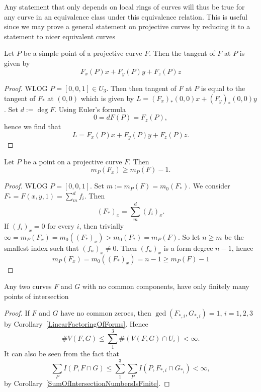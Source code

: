     \begin{remark}
        Any statement that only depends on local rings of curves will thus be true for any curve in an equivalence class under this equivalence relation. This is useful since we may prove a general statement on projective curves by reducing it to a statement to nicer equivalent curves 
    \end{remark}
    \begin{lemma}
        Let $P$ be a simple point of a projective curve $F$. Then the tangent of $F$ at $P$ is given by 
        $$F_x(P)x+F_y(P)y+F_z(P)z$$
    \end{lemma}
    \begin{proof}
        WLOG $P=[0,0,1]\in U_3$. Then then tangent of $F$ at $P$ is equal to the tangent of $F_\ast$ at $(0,0)$ which is given by $L=(F_x)_\ast(0,0)x+(F_y)_\ast(0,0)y$. Set $d:= \deg F$. Using Euler's formula
        $$0=dF(P) = F_z(P),$$
        hence we find that
        $$L= F_x(P)x+F_y(P)y+F_z(P)z.$$
    \end{proof}
    \begin{lemma}\label{MultiplicityOfPartialDerivative}
        Let $P$ be a point on a projective curve $F$. Then 
        $$m_P(F_x)\geq m_P(F)-1.$$
    \end{lemma}
    \begin{proof}
        WLOG $P=[0,0,1]$. Set $m:= m_P(F)=m_0(F_\ast)$. We consider $F_\ast=F(x,y,1)= \sum_m^d f_i$. Then 
        $$(F_\ast)_x = \sum_m ^d (f_i)_x.$$
        If $(f_i)_x=0$ for every $i$, then trivially $\infty = m_P(F_x)=m_0((F_\ast)_x)> m_0(F_\ast)=m_P(F)$. So let $n\geq m$ be the smallest index such that $(f_n)_x\neq0$. Then $(f_n)_x$ is a form degree $n-1$, hence 
        $$m_P(F_x)=m_0((F_\ast)_x)=n-1\geq m_P(F)-1$$
    \end{proof}
    \begin{proposition}\label{ProjectiveCurvesWithNoCommonComponentsHaveFinitelyManyIntersections}
        Any two curves $F$ and $G$ with no common components, have only finitely many points of intersection
    \end{proposition}
    \begin{proof}
        If $F$ and $G$ have no common zeroes, then $\gcd(F_{\ast,i},G_{\ast,i})=1$, $i=1,2,3$ by Corollary~\ref{LinearFactoringOfForms}. Hence 
        $$\#V(F,G)\leq \sum_1^3 \#(V(F,G)\cap U_i)<\infty.$$
        It can also be seen from the fact that 
        $$\sum_P I(P,F\cap G)\leq \sum_1^3 \sum_{P} I(P, F_{\ast,i}\cap G_{\ast_i})<\infty,$$
        by Corollary~\ref{SumOfIntersectionNumbersIsFinite}.
    \end{proof}
